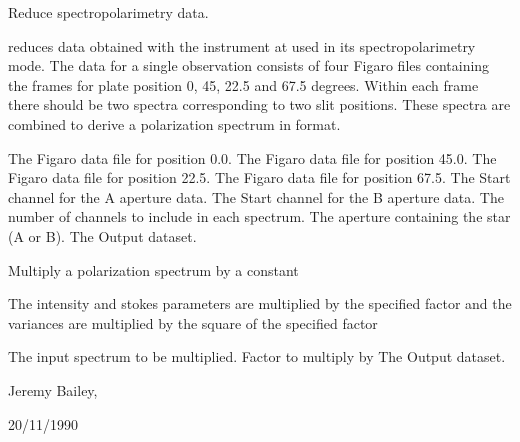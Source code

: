 \begin{manroutinedescription}
        Reduce {} spectropolarimetry data.

        {} reduces data obtained with the {} %
instrument at {}
        used in its spectropolarimetry mode. The data for a
        single observation consists of four Figaro files containing the
        frames for plate position 0, 45, 22.5 and 67.5 degrees. Within each
        frame there should be two spectra corresponding to two slit
        positions. These spectra are combined
        to derive a polarization spectrum in {} format.


\begin{manparametertable}
     The Figaro data file for %
position 0.0.
     The Figaro data file for %
position 45.0.
     The Figaro data file for %
position 22.5.
     The Figaro data file for %
position 67.5.
  The Start channel for the A %
aperture data.
  The Start channel for the B %
aperture data.
  The number of channels to %
include in each
                               spectrum.
     The aperture containing the %
star (A or B).
  The %
Output dataset.

\end{manparametertable}
\end{manroutinedescription}
\begin{manroutinedescription}
        Multiply a polarization spectrum by a constant

        The intensity and stokes parameters are multiplied
        by the specified factor and the variances are multiplied
        by the square of the specified factor

\begin{manparametertable}
  The input %
spectrum to be multiplied.
     Factor to multiply by
  The %
Output dataset.

\end{manparametertable}
         Jeremy Bailey, {}

          20/11/1990

\end{manroutinedescription}
